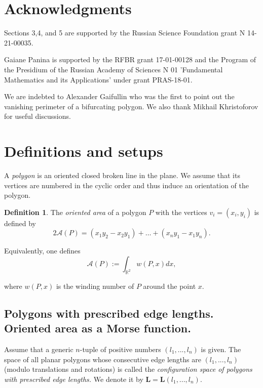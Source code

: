 \documentclass[12pt]{amsart}
\theoremstyle{plain}
\theoremstyle{definition}
\newtheorem{definition}{Definition}
\theoremstyle{remark}
\theoremstyle{plain}
\theoremstyle{definition}
\begin{document}
\section*{Acknowledgments}
Sections 3,4, and 5 are supported by the Russian Science Foundation grant N 14-21-00035.

Gaiane Panina is
 supported by the RFBR grant 17-01-00128  and   the Program of the Presidium of the Russian
 Academy of Sciences N 01 'Fundamental Mathematics and its Applications'
 under
 grant PRAS-18-01.

 We are indebted to Alexander Gaifullin who was the first to point out the vanishing perimeter of a bifurcating polygon.
We also thank Mikhail Khristoforov for useful discussions.


\section{Definitions and setups}

A \textit{polygon} is an oriented closed broken line in the plane. We assume that its vertices are numbered in the cyclic order and thus induce an orientation of the polygon.



\begin{definition} \label{Dfn_area} The \textit{oriented area} of a polygon $P$ with the vertices \newline $v_i = (x_i,
y_i)$  is defined by
$$2\mathcal{A}(P) = (x_1y_2 - x_2y_1) + \ldots + (x_ny_1 - x_1y_n).$$


Equivalently, one defines    $$\mathcal{A}(P):=\int_{\mathbb{R}^2} w(P,x)dx,$$

where $w(P,x)$  is the winding number of $P$ around  the point $x$.



\end{definition}


\subsection{Polygons with prescribed edge lengths. Oriented area as a Morse function.}  Assume that a generic $n$-tuple of positive numbers $(l_1,...,l_n)$ is given.
The space of all planar polygons whose consecutive edge lengths are  $(l_1,...,l_n)$ (modulo translations and rotations) is called the \textit{configuration space
of polygons with prescribed edge lengths.} We denote it by $\mathbf{L}=\mathbf{L}(l_1,...,l_n)$.
\end{document}
